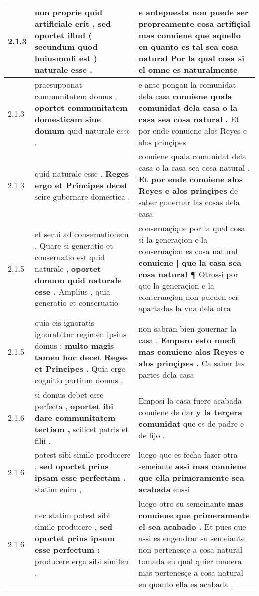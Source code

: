 \begin{tabular}{|p{1cm}|p{6.5cm}|p{6.5cm}|}
2.1.3 & non proprie quid artificiale erit , \textbf{ sed oportet illud } ( secundum quod huiusmodi est ) naturale esse . & e antepuesta non puede ser propreamente cosa artifiçial \textbf{ mas conuiene que aquello en quanto es tal sea cosa natural } Por la qual cosa si el omne es naturalmente \\\hline
2.1.3 & praesupponat communitatem domus , \textbf{ oportet communitatem domesticam siue domum } quid naturale esse . & e ante pongan la comunidat dela casa \textbf{ conuiene quala comunidat dela casa o la casa sea cosa natural . } Et por ende conuiene alos Reyes e alos prinçipes \\\hline
2.1.3 & quid naturale esse . \textbf{ Reges ergo et Principes decet } scire gubernare domestica , & conuiene quala comunidat dela casa o la casa sea cosa natural . \textbf{ Et por ende conuiene alos Reyes e alos prinçipes } de saber gouernar las cosas dela casa \\\hline
2.1.5 & et serui ad conseruationem . Quare si generatio et conseruatio est quid naturale , \textbf{ oportet domum quid naturale esse . } Amplius , quia generatio et conseruatio & conseruaçique por la qual cosa si la generaçion e la conseruaçion es cosa natural \textbf{ conuiene | que la casa sea cosa natural ¶ } Otrossi por que la generaçion e la conseruaçion non pueden ser apartadas la vna dela otra \\\hline
2.1.5 & quia eis ignoratis ignorabitur regimen ipsius domus ; \textbf{ multo magis tamen hoc decet Reges et Principes . } Quia ergo cognitio partium domus , & non sabran bien gouernar la casa . \textbf{ Empero esto much̃ mas conuiene alos Reyes e alos prinçipes . } Ca saber las partes dela casa \\\hline
2.1.6 & si domus debet esse perfecta , \textbf{ oportet ibi dare communitatem tertiam , } scilicet patris et filii . & Emposi la casa fuere acabada conuiene de dar \textbf{ y la terçera comunidat } que es de padre e de fijo . \\\hline
2.1.6 & potest sibi simile producere , \textbf{ sed oportet prius ipsam esse perfectam . } statim enim , & luego que es fecha fazer otra semeiante \textbf{ assi mas conuiene que ella primeramente sea acabada } enssi \\\hline
2.1.6 & nec statim potest sibi simile producere , \textbf{ sed oportet prius ipsum esse perfectum : } producere ergo sibi similem , & luego otro su semeinante \textbf{ mas conuiene que primeramente el sea acabado . } Et pues que assi es engendrar su semeiante non pertenesçe a cosa natural tomada en qual quier manera mas pertenesçe a cosa natural en quanto ella es acabada . \\\hline

\end{tabular}
